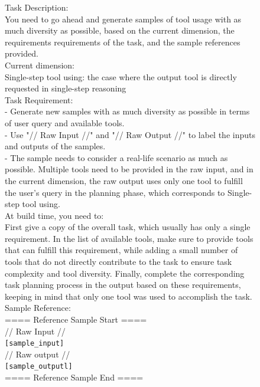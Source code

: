 \begin{figure}[!htb]
\small
\begin{tcolorbox}[
    colback=white, 
    colframe=blue1, 
    boxrule=0.5mm,
    arc=0mm,
    outer arc=0mm,
    title=Missing Necessary Tools: Single-step - Generation Prompt]
Task Description:\\
You need to go ahead and generate samples of tool usage with as much diversity as possible, based on the current dimension, the requirements requirements of the task, and the sample references provided.\\

Current dimension:\\
Single-step tool using: the case where the output tool is directly requested in single-step reasoning\\

Task Requirement:\\
- Generate new samples with as much diversity as possible in terms of user query and available tools.\\
- Use "// Raw Input //" and "// Raw Output //" to label the inputs and outputs of the samples.\\
- The sample needs to consider a real-life scenario as much as possible. Multiple tools need to be provided in the raw input, and in the current dimension, the raw output uses only one tool to fulfill the user's query in the planning phase, which corresponds to Single-step tool using.\\

At build time, you need to:\\
First give a copy of the overall task, which usually has only a single requirement. In the list of available tools, make sure to provide tools that can fulfill this requirement, while adding a small number of tools that do not directly contribute to the task to ensure task complexity and tool diversity. Finally, complete the corresponding task planning process in the output based on these requirements, keeping in mind that only one tool was used to accomplish the task.\\

Sample Reference:\\
==== Reference Sample Start ====\\
// Raw Input //\\
\colorbox{blue1!50}{\texttt{[sample\_input]}}\\

// Raw output //\\
\colorbox{blue1!50}{\texttt{[sample\_outputl]}}\\
==== Reference Sample End ====\\


\end{tcolorbox}
\end{figure}
